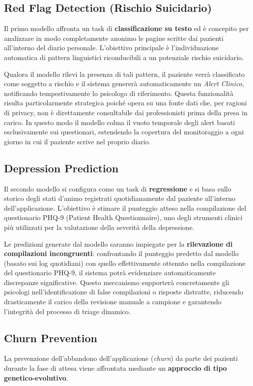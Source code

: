 \subsection{Red Flag Detection (Rischio Suicidario)}
\label{subsec:red_flag}
Il primo modello affronta un task di \textbf{classificazione su testo} ed è concepito per analizzare in modo completamente anonimo le pagine scritte dai pazienti all'interno del diario personale. L'obiettivo principale è l'individuazione automatica di pattern linguistici riconducibili a un potenziale rischio suicidario.

Qualora il modello rilevi la presenza di tali pattern, il paziente verrà classificato come soggetto a rischio e il sistema genererà automaticamente un \textit{Alert Clinico}, notificando tempestivamente lo psicologo di riferimento. Questa funzionalità risulta particolarmente strategica poiché opera su una fonte dati che, per ragioni di privacy, non è direttamente consultabile dai professionisti prima della presa in carico.
In questo modo il modello colma il vuoto temporale degli alert basati esclusivamente sui questionari, estendendo la copertura del monitoraggio a ogni giorno in cui il paziente scrive nel proprio diario.

\subsection{Depression Prediction}
\label{subsec:depression}
Il secondo modello si configura come un task di \textbf{regressione} e si basa sullo storico degli stati d'animo registrati quotidianamente dal paziente all'interno dell'applicazione. L'obiettivo è stimare il punteggio atteso nella compilazione del questionario PHQ-9 (Patient Health Questionnaire), uno degli strumenti clinici più utilizzati per la valutazione della severità della depressione.

Le predizioni generate dal modello saranno impiegate per la \textbf{rilevazione di compilazioni incongruenti}: confrontando il punteggio predetto dal modello (basato sui log quotidiani) con quello effettivamente ottenuto nella compilazione del questionario PHQ-9, il sistema potrà evidenziare automaticamente discrepanze significative. Questo meccanismo supporterà concretamente gli psicologi nell'identificazione di false compilazioni o risposte distratte, riducendo drasticamente il carico della revisione manuale a campione e garantendo l'integrità del processo di triage dinamico.

\subsection{Churn Prevention}
\label{subsec:churn}
La prevenzione dell'abbandono dell'applicazione (\textit{churn}) da parte dei pazienti durante la fase di attesa viene affrontata mediante un \textbf{approccio di tipo genetico-evolutivo}.

